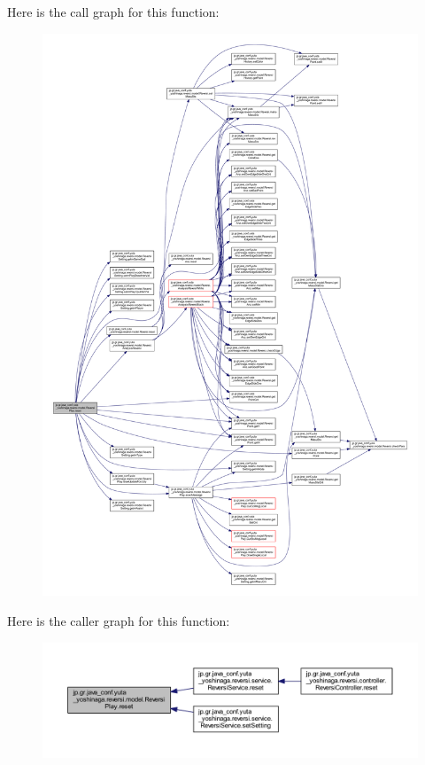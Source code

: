 Here is the call graph for this function\+:
\nopagebreak
\begin{figure}[H]
\begin{center}
\leavevmode
\includegraphics[width=350pt]{classjp_1_1gr_1_1java__conf_1_1yuta__yoshinaga_1_1reversi_1_1model_1_1_reversi_play_a040fddf6e59c00de4c9c2ecdaedcb574_cgraph}
\end{center}
\end{figure}
Here is the caller graph for this function\+:
\nopagebreak
\begin{figure}[H]
\begin{center}
\leavevmode
\includegraphics[width=350pt]{classjp_1_1gr_1_1java__conf_1_1yuta__yoshinaga_1_1reversi_1_1model_1_1_reversi_play_a040fddf6e59c00de4c9c2ecdaedcb574_icgraph}
\end{center}
\end{figure}

